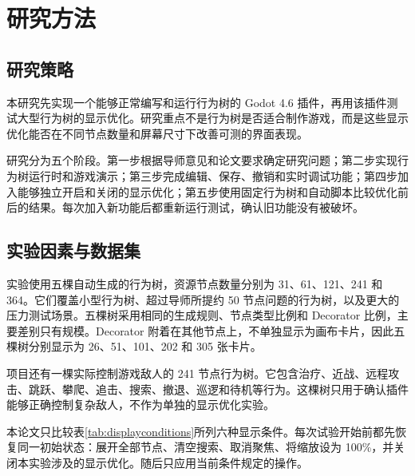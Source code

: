 \chapter{研究方法}
\label{ch:methodology}

\section{研究策略}

本研究先实现一个能够正常编写和运行行为树的 Godot 4.6 插件，再用该插件测试大型行为树的显示优化。研究重点不是行为树是否适合制作游戏，而是这些显示优化能否在不同节点数量和屏幕尺寸下改善可测的界面表现。

研究分为五个阶段。第一步根据导师意见和论文要求确定研究问题；第二步实现行为树运行时和游戏演示；第三步完成编辑、保存、撤销和实时调试功能；第四步加入能够独立开启和关闭的显示优化；第五步使用固定行为树和自动脚本比较优化前后的结果。每次加入新功能后都重新运行测试，确认旧功能没有被破坏。

\section{实验因素与数据集}

实验使用五棵自动生成的行为树，资源节点数量分别为 31、61、121、241 和 364。它们覆盖小型行为树、超过导师所提约 50 节点问题的行为树，以及更大的压力测试场景。五棵树采用相同的生成规则、节点类型比例和 Decorator 比例，主要差别只有规模。Decorator 附着在其他节点上，不单独显示为画布卡片，因此五棵树分别显示为 26、51、101、202 和 305 张卡片。

项目还有一棵实际控制游戏敌人的 241 节点行为树。它包含治疗、近战、远程攻击、跳跃、攀爬、追击、搜索、撤退、巡逻和待机等行为。这棵树只用于确认插件能够正确控制复杂敌人，不作为单独的显示优化实验。

本论文只比较表\ref{tab:displayconditions}所列六种显示条件。每次试验开始前都先恢复同一初始状态：展开全部节点、清空搜索、取消聚焦、将缩放设为 100\%，并关闭本实验涉及的显示优化。随后只应用当前条件规定的操作。

